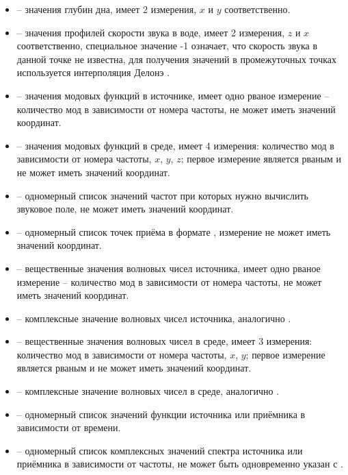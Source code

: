 \documentclass[../document.tex]{subfiles}
\begin{document}
\begin{itemize}
                            \begin{itemize}
                                \item{} -- значения глубин дна, имеет 2 измерения, $x$ и $y$ соответственно.
                                \item{} -- значения профилей скорости звука в воде, имеет 2 измерения, $z$ и $x$ соответственно, специальное значение -1 означает, что скорость звука в данной точке не известна, для получения значений в промежуточных точках используется интерполяция Делонэ \cite{delaunay_interpolation}.
                                \item{} -- значения модовых функций в источнике, имеет одно рваное измерение -- количество мод в зависимости от номера частоты, не может иметь значений координат.
                                \item{} -- значения модовых функций в среде, имеет 4 измерения: количество мод в зависимости от номера частоты, $x$, $y$, $z$; первое измерение является рваным и не может иметь значений координат.
                                \item{} -- одномерный список значений частот при которых нужно вычислить звуковое поле, не может иметь значений координат.
                                \item{} -- одномерный список точек приёма в формате \hyperref[misc::point]{}, измерение не может иметь значений координат.
                                \item{} -- вещественные значения волновых чисел источника, имеет одно рваное измерение -- количество мод в зависимости от номера частоты, не может иметь значений координат.
                                \item{} -- комплексные значение волновых чисел источника, аналогично .
                                \item{} -- вещественные значения волновых чисел в среде, имеет 3 измерения: количество мод в зависимости от номера частоты, $x$, $y$; первое измерение является рваным и не может иметь значений координат.
                                \item{} -- комплексные значение волновых чисел в среде, аналогично .
                                \item{} -- одномерный список значений функции источника или приёмника в зависимости от времени.
                                \item{} -- одномерный список комплексных значений спектра источника или приёмника в зависимости от частоты, не может быть одновременно указан с .
                            \end{itemize}
                    \end{itemize}
                    \FloatBarrier
\end{document}
